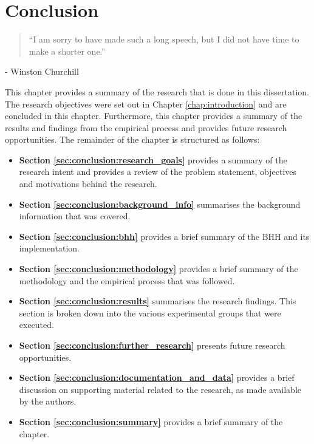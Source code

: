 \chapter{Conclusion}
\label{chap:conclusion}

\begin{quotation}
      ``I am sorry to have made such a long speech, but I did not have time to make a shorter one.''
\end{quotation}
\begin{flushright}
      - Winston Churchill
\end{flushright}

This chapter provides a summary of the research that is done in this dissertation. The research objectives were set out in Chapter \ref{chap:introduction} and are concluded in this chapter. Furthermore, this chapter provides a summary of the results and findings from the empirical process and provides future research opportunities. The remainder of the chapter is structured as follows:

\begin{itemize}
      \item \textbf{Section \ref{sec:conclusion:research_goals}} provides a summary of the research intent and provides a review of the problem statement, objectives and motivations behind the research.

      \item \textbf{Section \ref{sec:conclusion:background_info}} summarises the background information that was covered.

      \item \textbf{Section \ref{sec:conclusion:bhh}} provides a brief summary of the \ac{BHH} and its implementation.

      \item \textbf{Section \ref{sec:conclusion:methodology}} provides a brief summary of the methodology and the empirical process that was followed.

      \item \textbf{Section \ref{sec:conclusion:results}} summarises the research findings. This section is broken down into the various experimental groups that were executed.

      \item \textbf{Section \ref{sec:conclusion:further_research}} presents future research opportunities.

      \item \textbf{Section \ref{sec:conclusion:documentation_and_data}} provides a brief discussion on supporting material related to the research, as made available by the authors.

      \item \textbf{Section \ref{sec:conclusion:summary}} provides a brief summary of the chapter.
\end{itemize}

